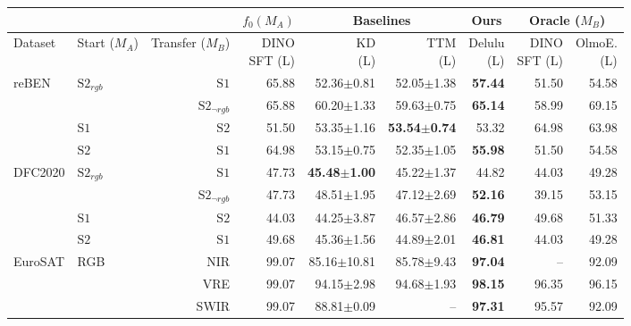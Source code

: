 \begin{tabular}{llr | r r r r r r}
\toprule
\multicolumn{3}{c}{} & \multicolumn{1}{c|}{$f_0(M_A)$} & \multicolumn{2}{c|}{Baselines} & \multicolumn{1}{c|}{Ours} & \multicolumn{2}{c}{Oracle ($M_B$)} \\
\midrule
Dataset & \shortstack[c]{Start\\($M_A$)} & \shortstack[c]{Transfer\\($M_B$)} & \shortstack[c]{DINO\\SFT (L)} & \shortstack[c]{KD\\(L)} & \shortstack[c]{TTM\\(L)} & \shortstack[c]{Delulu\\(L)} & \shortstack[c]{DINO\\SFT (L)} & \shortstack[c]{OlmoE.\\(L)} \\
\midrule
  \multirow{4}{*}{reBEN} & \multirow{2}{*}{$\mathrm{S2}_{rgb}$} & $\mathrm{S1}$ & 65.88 & 52.36$\pm$0.81 & 52.05$\pm$1.38 & \textbf{57.44} & 51.50 & 54.58 \\
   &  & $\mathrm{S2}_{\neg rgb}$ & 65.88 & 60.20$\pm$1.33 & 59.63$\pm$0.75 & \textbf{65.14} & 58.99 & 69.15 \\
   & $\mathrm{S1}$ & $\mathrm{S2}$ & 51.50 & 53.35$\pm$1.16 & \textbf{53.54$\pm$0.74} & 53.32 & 64.98 & 63.98 \\
   & $\mathrm{S2}$ & $\mathrm{S1}$ & 64.98 & 53.15$\pm$0.75 & 52.35$\pm$1.05 & \textbf{55.98} & 51.50 & 54.58 \\
  \midrule
  \multirow{4}{*}{DFC2020} & \multirow{2}{*}{$\mathrm{S2}_{rgb}$} & $\mathrm{S1}$ & 47.73 & \textbf{45.48$\pm$1.00} & 45.22$\pm$1.37 & 44.82 & 44.03 & 49.28 \\
   &  & $\mathrm{S2}_{\neg rgb}$ & 47.73 & 48.51$\pm$1.95 & 47.12$\pm$2.69 & \textbf{52.16} & 39.15 & 53.15 \\
   & $\mathrm{S1}$ & $\mathrm{S2}$ & 44.03 & 44.25$\pm$3.87 & 46.57$\pm$2.86 & \textbf{46.79} & 49.68 & 51.33 \\
   & $\mathrm{S2}$ & $\mathrm{S1}$ & 49.68 & 45.36$\pm$1.56 & 44.89$\pm$2.01 & \textbf{46.81} & 44.03 & 49.28 \\
  \midrule
  \multirow{3}{*}{EuroSAT} & \multirow{3}{*}{RGB} & NIR & 99.07 & 85.16$\pm$10.81 & 85.78$\pm$9.43 & \textbf{97.04} & -- & 92.09 \\
   &  & VRE & 99.07 & 94.15$\pm$2.98 & 94.68$\pm$1.93 & \textbf{98.15} & 96.35 & 96.15 \\
   &  & SWIR & 99.07 & 88.81$\pm$0.09 & -- & \textbf{97.31} & 95.57 & 92.09 \\
\bottomrule
\end{tabular}

